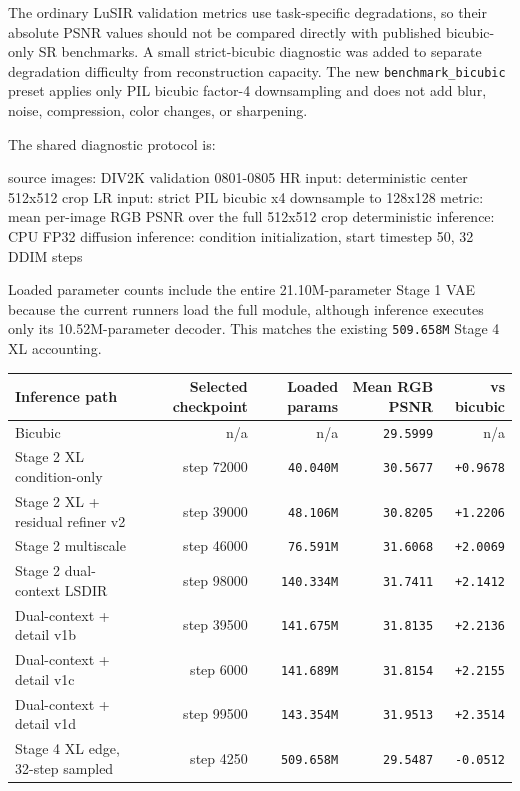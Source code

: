 \documentclass[
  10pt,
]{article}
\newenvironment{Shaded}{}{}
\newcommand{\NormalTok}[1]{#1}
\begin{document}
The ordinary LuSIR validation metrics use task-specific degradations, so
their absolute PSNR values should not be compared directly with
published bicubic-only SR benchmarks. A small strict-bicubic diagnostic
was added to separate degradation difficulty from reconstruction
capacity. The new \texttt{benchmark\_bicubic} preset applies only PIL
bicubic factor-4 downsampling and does not add blur, noise, compression,
color changes, or sharpening.

The shared diagnostic protocol is:

\begin{Shaded}
\begin{Highlighting}[]
\NormalTok{source images: DIV2K validation 0801{-}0805}
\NormalTok{HR input: deterministic center 512x512 crop}
\NormalTok{LR input: strict PIL bicubic x4 downsample to 128x128}
\NormalTok{metric: mean per{-}image RGB PSNR over the full 512x512 crop}
\NormalTok{deterministic inference: CPU FP32}
\NormalTok{diffusion inference: condition initialization, start timestep 50, 32 DDIM steps}
\end{Highlighting}
\end{Shaded}

Loaded parameter counts include the entire 21.10M-parameter Stage 1 VAE
because the current runners load the full module, although inference
executes only its 10.52M-parameter decoder. This matches the existing
\texttt{509.658M} Stage 4 XL accounting.

\begin{longtable}[]{@{}lrrrr@{}}
\toprule\noalign{}
Inference path & Selected checkpoint & Loaded params & Mean RGB PSNR &
vs bicubic \\
\midrule\noalign{}
\endhead
\bottomrule\noalign{}
\endlastfoot
Bicubic & n/a & n/a & \texttt{29.5999} & n/a \\
Stage 2 XL condition-only & step 72000 & \texttt{40.040M} &
\texttt{30.5677} & \texttt{+0.9678} \\
Stage 2 XL + residual refiner v2 & step 39000 & \texttt{48.106M} &
\texttt{30.8205} & \texttt{+1.2206} \\
Stage 2 multiscale & step 46000 & \texttt{76.591M} & \texttt{31.6068} &
\texttt{+2.0069} \\
Stage 2 dual-context LSDIR & step 98000 & \texttt{140.334M} &
\texttt{31.7411} & \texttt{+2.1412} \\
Dual-context + detail v1b & step 39500 & \texttt{141.675M} &
\texttt{31.8135} & \texttt{+2.2136} \\
Dual-context + detail v1c & step 6000 & \texttt{141.689M} &
\texttt{31.8154} & \texttt{+2.2155} \\
Dual-context + detail v1d & step 99500 & \texttt{143.354M} &
\texttt{31.9513} & \texttt{+2.3514} \\
Stage 4 XL edge, 32-step sampled & step 4250 & \texttt{509.658M} &
\texttt{29.5487} & \texttt{-0.0512} \\
\end{longtable}
\end{document}
